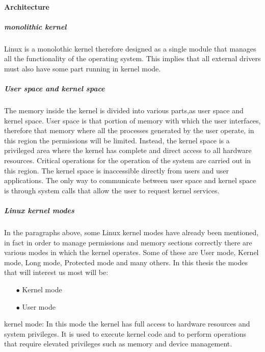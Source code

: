 \documentclass{report}
\begin{document}
    \paragraph{Architecture}
    \subparagraph{monolithic kernel}
    Linux is a monolothic kernel therefore designed as a single module that manages all the functionality of the operating system.\newline
    This implies that all external drivers must also have some part running in kernel mode.\newline
    \subparagraph{User space and kernel space}
    The memory inside the kernel is divided into various parts,as user space and kernel space.\newline
    User space is that portion of memory with which the user interfaces, therefore that memory where all the processes generated by the user operate, in this region the permissions will be limited.\newline
    Instead, the kernel space is a privileged area where the kernel has complete and direct access to all hardware resources.\newline
    Critical operations for the operation of the system are carried out in this region.\newline
    The kernel space is inaccessible directly from users and user applications.\newline
    The only way to communicate between user space and kernel space is through system calls that allow the user to request kernel services.\newline
    \subparagraph{Linux kernel modes}
    In the paragraphs above, some Linux kernel modes have already been mentioned, in fact in order to manage permissions and memory sections correctly there are various modes in which the kernel operates.\newline
    Some of these are User mode, Kernel mode, Long mode, Protected mode and many others.\newline
    In this thesis the modes that will interest us most will be:\newline
    \begin{itemize}
        \item[$\bullet$] Kernel mode
        \item[$\bullet$] User mode
    \end{itemize}
    kernel mode: In this mode the kernel has full access to hardware resources and system privileges.\newline
    It is used to execute kernel code and to perform operations that require elevated privileges such as memory and device management.\newline
\end{document}

